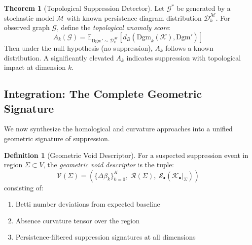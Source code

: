 \documentclass[12pt,a4paper]{article}
\theoremstyle{definition}
\newtheorem{definition}{Definition}[section]
\newtheorem{theorem}{Theorem}[section]
\theoremstyle{remark}
\newcommand{\Graph}{\mathcal{G}}         %
\begin{document}
\begin{theorem}[Topological Suppression Detector]
\label{thm:detector}
Let $\Graph^*$ be generated by a stochastic model $\mathcal{M}$ with known persistence diagram distribution $\mathcal{D}_k^{\mathcal{M}}$. For observed graph $\Graph$, define the \emph{topological anomaly score}:
\begin{equation}
    \boxed{
    A_k(\Graph) = \mathbb{E}_{\text{Dgm}' \sim \mathcal{D}_k^{\mathcal{M}}} \left[ d_B(\text{Dgm}_k(\mathcal{K}), \text{Dgm}') \right]
    }
\end{equation}
Then under the null hypothesis (no suppression), $A_k$ follows a known distribution. A significantly elevated $A_k$ indicates suppression with topological impact at dimension $k$.
\end{theorem}

\subsection{Integration: The Complete Geometric Signature}

We now synthesize the homological and curvature approaches into a unified geometric signature of suppression.

\begin{definition}[Geometric Void Descriptor]
For a suspected suppression event in region $\Sigma \subset V$, the \emph{geometric void descriptor} is the tuple:
\begin{equation}
    \boxed{
    \mathcal{V}(\Sigma) = \left( \{\Delta\beta_k\}_{k=0}^{K}, \; \mathcal{R}(\Sigma), \; \mathcal{S}_\bullet(\mathcal{K}_\bullet|_\Sigma) \right)
    }
\end{equation}
consisting of:
\begin{enumerate}
    \item Betti number deviations from expected baseline
    \item Absence curvature tensor over the region
    \item Persistence-filtered suppression signatures at all dimensions
\end{enumerate}
\end{definition}
\end{document}

